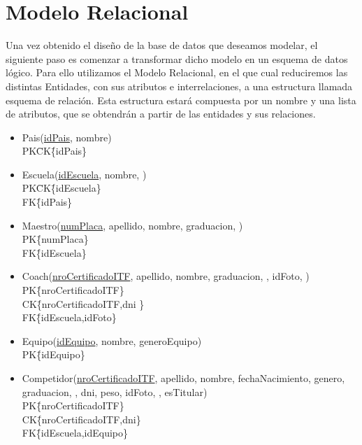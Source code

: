 \newpage
\section{Modelo Relacional}

Una vez obtenido el diseño de la base de datos que deseamos modelar, el siguiente paso es comenzar a transformar dicho modelo en un esquema de datos lógico. Para ello utilizamos el Modelo Relacional, en el que cual reduciremos las distintas Entidades, con sus atributos e interrelaciones, a una estructura llamada esquema de relación. Esta estructura estará compuesta por un nombre y una lista de atributos, que se obtendrán a partir de las entidades y sus relaciones.

\begin{itemize}

\item{Pais(\underline{idPais}, nombre)\\
PK\=CK\=\{idPais\}}

\item{Escuela(\underline{idEscuela}, nombre, )\\
PK\=CK\=\{idEscuela\}\\
FK\=\{idPais\}
}

\item{Maestro(\underline{numPlaca}, apellido, nombre, graduacion, )\\
PK\=\{numPlaca\} \\
FK\=\{idEscuela\} \\
}

\item{Coach(\underline{nroCertificadoITF}, apellido, nombre, graduacion, , idFoto, )\\
PK\=\{nroCertificadoITF\} \\
CK\=\{nroCertificadoITF,dni	\} \\
FK\=\{idEscuela,idFoto\} \\
}

\item{Equipo(\underline{idEquipo}, nombre, generoEquipo)\\
PK\=\{idEquipo\} \\
}

\item{Competidor(\underline{nroCertificadoITF}, apellido, nombre, fechaNacimiento, genero, graduacion, , dni, peso, idFoto, , esTitular) \\
PK\=\{nroCertificadoITF\} \\
CK\=\{nroCertificadoITF,dni\} \\
FK\=\{idEscuela,idEquipo\}
}


\end{itemize}
